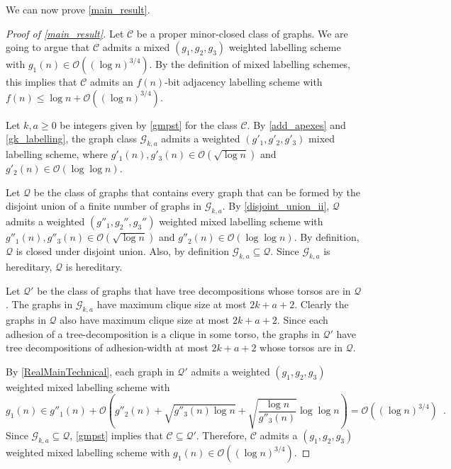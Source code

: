 \documentclass{patmorin}
\renewcommand{\ge}{\geqslant}
\renewcommand{\le}{\leqslant}
\renewcommand{\geq}{\geqslant}
\newcommand{\Oh}{\calO}
\newcommand{\calC}{\mathcal{C}}
\newcommand{\calG}{\mathcal{G}}
\newcommand{\calO}{\mathcal{O}}
\newcommand{\calQ}{\mathcal{Q}}
\begin{document}


  We can now prove \cref{main_result}.

  \begin{proof}[Proof of \cref{main_result}]
     Let $\calC$ be a proper minor-closed class of graphs. 
     We are going to argue that $\calC$ admits a mixed $(g_1,g_2,g_3)$ weighted labelling scheme with $g_1(n) \in \Oh((\log n)^{3/4})$. By the definition of mixed labelling schemes, this implies that $\calC$ admits an $f(n)$-bit adjacency labelling scheme with $f(n)\le\log n + \Oh((\log n)^{3/4})$.
     
     Let $k,a\geq 0$ be integers given by \cref{gmpst} for the class $\calC$. 
     By \cref{add_apexes} and \cref{gk_labelling}, the graph class $\calG_{k,a}$ admits a weighted $(g'_1,g'_2,g'_3)$ mixed labelling scheme, where $g'_1(n),g'_3(n)\in \Oh(\sqrt{\log n})$ and $g'_2(n)\in \Oh(\log\log n)$.

     Let $\calQ$ be the class of graphs that contains every graph that can be formed by the disjoint union of a finite number of graphs in $\calG_{k,a}$.  By \cref{disjoint_union_ii}, $\calQ$ admits a weighted $(g''_1,g_2'',g_3'')$ weighted mixed labelling scheme with $g''_1(n),g''_3(n)\in \Oh(\sqrt{\log n})$ and $g''_2(n)\in \Oh(\log\log n)$.   By definition, $\calQ$ is closed under disjoint union.  Also, by definition $\calG_{k,a}\subseteq\calQ$. Since $\calG_{k,a}$ is hereditary, $\calQ$ is hereditary.

     Let $\calQ'$ be the class of graphs that have tree decompositions whose torsos are in $\calQ$.  The graphs in $\calG_{k,a}$ have maximum clique size at most $2k+a+2$.  Clearly the graphs in $\calQ$ also have maximum clique size at most $2k+a+2$. Since each adhesion of a tree-decomposition is a clique in some torso, the graphs in $\calQ'$ have tree decompositions of adhesion-width at most $2k+a+2$ whose torsos are in $\calQ$.

     By \cref{RealMainTechnical}, each graph in $\calQ'$ admits a weighted $(g_1,g_2,g_3)$ weighted mixed labelling scheme with 
     \[ 
       g_1(n) \in g''_1(n) + \Oh\left(g''_2(n) + \sqrt{g''_3(n)\log n} 
       + \sqrt{\frac{\log n}{g''_3(n)}}\log\log n\right) = \Oh((\log n)^{3/4}) \enspace.
     \]     
     Since $\calG_{k,a}\subseteq\calQ$, \cref{gmpst} implies that $\calC\subseteq\calQ'$.  Therefore, $\calC$ admits a $(g_1,g_2,g_3)$ weighted mixed labelling scheme with $g_1(n)\in \Oh((\log n)^{3/4})$.  
  \end{proof}
\end{document}
